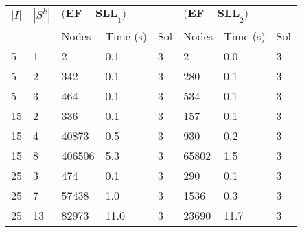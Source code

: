 
\begin{tabularx}{\textwidth}{ll *{6}{Y}}
    \toprule
    $|I|$ & $|S^k|$
        & & \\
    \cmidrule(lr){3-5} \cmidrule(lr){6-8}
    & & Nodes & Time (s) & Sol & Nodes & Time (s) & Sol\\
     & 1 & 2 & 0.1 & 3 & 2 & 0.0 & 3\\
    5 & 2 & 342 & 0.1 & 3 & 280 & 0.1 & 3\\
    5 & 3 & 464 & 0.1 & 3 & 534 & 0.1 & 3\\
    15 & 2 & 336 & 0.1 & 3 & 157 & 0.1 & 3\\
    15 & 4 & 40873 & 0.5 & 3 & 930 & 0.2 & 3\\
    15 & 8 & 406506 & 5.3 & 3 & 65802 & 1.5 & 3\\
    25 & 3 & 474 & 0.1 & 3 & 290 & 0.1 & 3\\
    25 & 7 & 57438 & 1.0 & 3 & 1536 & 0.3 & 3\\
    25 & 13 & 82973 & 11.0 & 3 & 23690 & 11.7 & 3\\
    \bottomrule
\end{tabularx}
